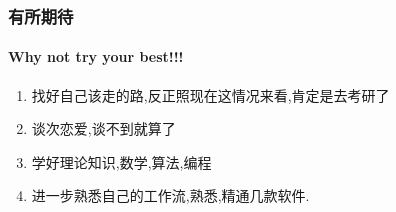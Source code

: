 \documentclass{beamer}
\begin{document}
	\begin{frame}
		\frametitle{有所期待}
		\framesubtitle{Why not try your best!!!}
		\begin{enumerate}[<+->]
			\item[\Romannum{1}] 找好自己该走的路,反正照现在这情况来看,肯定是去考研了
			\item[\Romannum{2}] 谈次恋爱,\small{谈不到就算了}
			\item[\Romannum{3}]学好理论知识,数学,算法,编程
			\item[\Romannum{4}]进一步熟悉自己的工作流,熟悉,精通几款软件.
		\end{enumerate}
	\end{frame}
	
\end{document}
